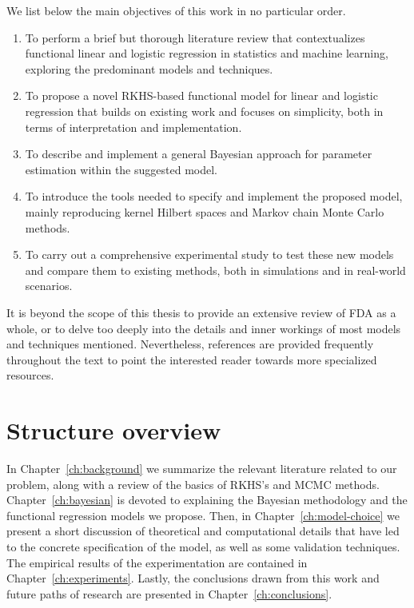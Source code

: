 We list below the main objectives of this work in no particular order.

\begin{enumerate}[1.]
  \item To perform a brief but thorough literature review that contextualizes functional linear and logistic regression in statistics and machine learning, exploring the predominant models and techniques.
  \item To propose a novel RKHS-based functional model for linear and logistic regression that builds on existing work and focuses on simplicity, both in terms of interpretation and implementation.
  \item To describe and implement a general Bayesian approach for parameter estimation within the suggested model.
  \item To introduce the tools needed to specify and implement the proposed model, mainly reproducing kernel Hilbert spaces and Markov chain Monte Carlo methods.
  \item To carry out a comprehensive experimental study to test these new models and compare them to existing methods, both in simulations and in real-world scenarios.
\end{enumerate}

It is beyond the scope of this thesis to provide an extensive review of FDA as a whole, or to delve too deeply into the details and inner workings of most models and techniques mentioned. Nevertheless, references are provided frequently throughout the text to point the interested reader towards more specialized resources.

\section{Structure overview}

In Chapter~\ref{ch:background} we summarize the relevant literature related to our problem, along with a review of the basics of RKHS's and MCMC methods. Chapter~\ref{ch:bayesian} is devoted to explaining the Bayesian methodology and the functional regression models we propose. Then, in Chapter~\ref{ch:model-choice} we present a short discussion of theoretical and computational details that have led to the concrete specification of the model, as well as some validation techniques. The empirical results of the experimentation are contained in Chapter~\ref{ch:experiments}. Lastly, the conclusions drawn from this work and future paths of research are presented in Chapter~\ref{ch:conclusions}.
